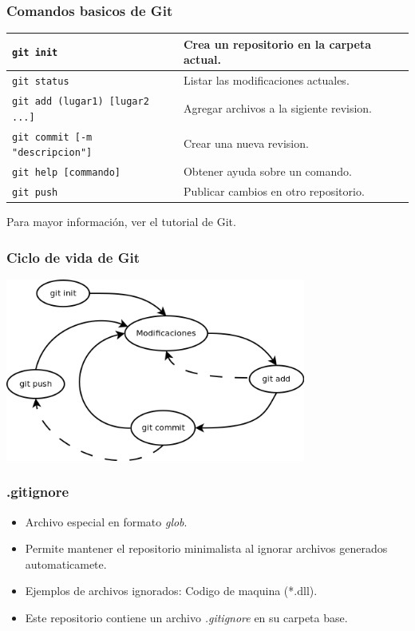 \documentclass{beamer}
\begin{document}
\begin{frame}
\frametitle{Comandos basicos de Git}
\begin{tabular}{|l|p{5cm}|}
    \hline
    \texttt{git init} & {Crea un repositorio en la carpeta actual.} \\
    \hline
    \texttt{git status} & Listar las modificaciones actuales. \\
    \hline
    \texttt{git add (lugar1) [lugar2 ...]} & Agregar archivos a la sigiente revision. \\
    \hline
    \texttt{git commit [-m "descripcion"]} & Crear una nueva revision. \\
    \hline
    \texttt{git help [commando]} & Obtener ayuda sobre un comando. \\
    \hline
    \texttt{git push} & Publicar cambios en otro repositorio. \\
    \hline
\end{tabular}
\newline\newline
Para mayor informaci\'on, ver el tutorial de Git\cite{GitTutorial}.
\end{frame}

\begin{frame}
\frametitle{Ciclo de vida de Git}
\begin{center}
\includegraphics[height=6cm]{gitcycle.png}
\end{center}
\end{frame}

\begin{frame}
\frametitle{.gitignore}
\begin{itemize}
    \item Archivo especial en formato \emph{glob}\cite{Gitignore}.
    \item Permite mantener el repositorio minimalista al ignorar archivos generados automaticamete.
    \item Ejemplos de archivos ignorados: Codigo de maquina (*.dll).
    \item Este repositorio contiene un archivo \emph{.gitignore} en su carpeta base.
\end{itemize}
\end{frame}

\begin{frame}


\end{frame}
\end{document}
